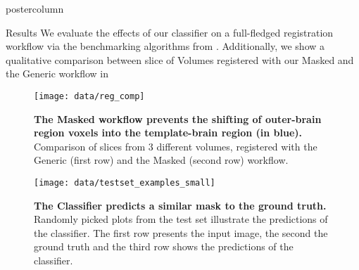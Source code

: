 \begin{frame}
\begin{columns}
\begin{column}{.59\textwidth}
\begin{beamercolorbox}[center]{postercolumn}
\begin{minipage}{.98\textwidth}
{                            \begin{myblock}{Results}
                                We evaluate the effects of our classifier on a full-fledged registration workflow via the benchmarking algorithms from \cite{ioanas_optimized_2019}.
                                Additionally, we show a qualitative comparison between slice of Volumes registered with our Masked and the Generic workflow in
                                \begin{figure}
                                    \texttt{[image: data/reg\_comp]}
                                    \caption{\textbf{The Masked workflow prevents the shifting of outer-brain region voxels into the template-brain region (in blue).} Comparison of slices from 3 different volumes, registered with the Generic (first row) and the Masked (second row) workflow.}
                                \end{figure}

                                \begin{figure}
                                    \texttt{[image: data/testset\_examples\_small]}
                                    \caption{\textbf{The Classifier predicts a similar mask to the ground truth.}
                                    Randomly picked plots from the test set illustrate the predictions of the classifier.
                                    The first row presents the input image, the second the ground truth and the third row shows the predictions of the classifier.}
                                \end{figure}



\end{myblock}}
\end{minipage}
\end{beamercolorbox}
\end{column}
\end{columns}
\end{frame}
